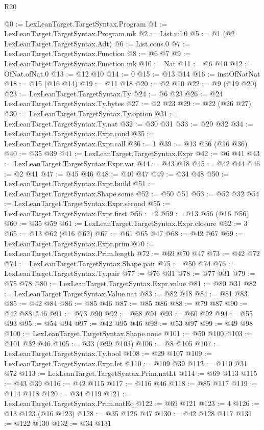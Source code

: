 \begin{lexlean}{R20}
\begin{coremodule}
{{{{{{{{{{{{{{{{{{{@0 := LexLeanTarget.TargetSyntax.Program
@1 := LexLeanTarget.TargetSyntax.Program.mk
@2 := List.nil.{0}
@5 := @1 (@2 LexLeanTarget.TargetSyntax.Adt)
@6 := List.cons.{0}
@7 := LexLeanTarget.TargetSyntax.Function
@8 := @6 @7
@9 := LexLeanTarget.TargetSyntax.Function.mk
@10 := Nat
@11 := @6 @10
@12 := OfNat.ofNat.{0}
@13 := @12 @10
@14 := 0
@15 := @13 @14
@16 := instOfNatNat
@18 := @15 (@16 @14)
@19 := @11 @18
@20 := @2 @10
@22 := @9 (@19 @20)
@23 := LexLeanTarget.TargetSyntax.Ty
@24 := @6 @23
@26 := @24 LexLeanTarget.TargetSyntax.Ty.bytes
@27 := @2 @23
@29 := @22 (@26 @27)
@30 := LexLeanTarget.TargetSyntax.Ty.option
@31 := LexLeanTarget.TargetSyntax.Ty.nat
@32 := @30 @31
@33 := @29 @32
@34 := LexLeanTarget.TargetSyntax.Expr.cond
@35 := LexLeanTarget.TargetSyntax.Expr.call
@36 := 1
@39 := @13 @36 (@16 @36)
@40 := @35 @39
@41 := LexLeanTarget.TargetSyntax.Expr
@42 := @6 @41
@43 := LexLeanTarget.TargetSyntax.Expr.var
@44 := @43 @18
@45 := @42 @44
@46 := @2 @41
@47 := @45 @46
@48 := @40 @47
@49 := @34 @48
@50 := LexLeanTarget.TargetSyntax.Expr.build
@51 := LexLeanTarget.TargetSyntax.Shape.some
@52 := @50 @51
@53 := @52 @32
@54 := LexLeanTarget.TargetSyntax.Expr.second
@55 := LexLeanTarget.TargetSyntax.Expr.first
@56 := 2
@59 := @13 @56 (@16 @56)
@60 := @35 @59
@61 := LexLeanTarget.TargetSyntax.Expr.closure
@62 := 3
@65 := @13 @62 (@16 @62)
@67 := @61 @65 @47
@68 := @42 @67
@69 := LexLeanTarget.TargetSyntax.Expr.prim
@70 := LexLeanTarget.TargetSyntax.Prim.length
@72 := @69 @70 @47
@73 := @42 @72
@74 := LexLeanTarget.TargetSyntax.Shape.pair
@75 := @50 @74
@76 := LexLeanTarget.TargetSyntax.Ty.pair
@77 := @76 @31
@78 := @77 @31
@79 := @75 @78
@80 := LexLeanTarget.TargetSyntax.Expr.value
@81 := @80 @31
@82 := LexLeanTarget.TargetSyntax.Value.nat
@83 := @82 @18
@84 := @81 @83
@85 := @42 @84
@86 := @85 @46
@87 := @85 @86
@88 := @79 @87
@90 := @42 @88 @46
@91 := @73 @90
@92 := @68 @91
@93 := @60 @92
@94 := @55 @93
@95 := @54 @94
@97 := @42 @95 @46
@98 := @53 @97
@99 := @49 @98
@100 := LexLeanTarget.TargetSyntax.Shape.none
@101 := @50 @100
@103 := @101 @32 @46
@105 := @33 (@99 @103)
@106 := @8 @105
@107 := LexLeanTarget.TargetSyntax.Ty.bool
@108 := @29 @107
@109 := LexLeanTarget.TargetSyntax.Expr.let
@110 := @109 @39
@112 := @110 @31 @72
@113 := LexLeanTarget.TargetSyntax.Prim.natLt
@114 := @69 @113
@115 := @43 @39
@116 := @42 @115
@117 := @116 @46
@118 := @85 @117
@119 := @114 @118
@120 := @34 @119
@121 := LexLeanTarget.TargetSyntax.Prim.natEq
@122 := @69 @121
@123 := 4
@126 := @13 @123 (@16 @123)
@128 := @35 @126 @47
@130 := @42 @128 @117
@131 := @122 @130
@132 := @34 @131
}}}}}}}}}}}}}}}}}}}
\end{coremodule}
\end{lexlean}
